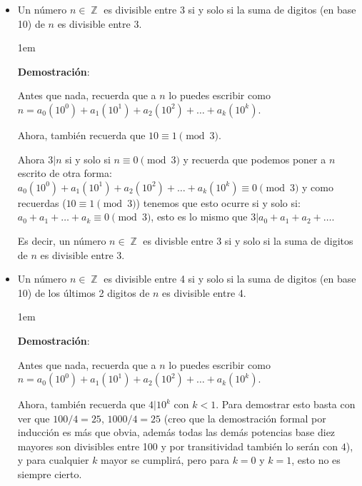\documentclass[12pt, fleqn]{report}                             %
\newenvironment{SmallIndentation}[1][0.75em]                    %
    {\begin{adjustwidth}{#1}{}\begin{footnotesize}}                 %
    {\end{footnotesize}\end{adjustwidth}}                           %
\DeclareMathOperator \Integers  {\mathbb{Z}}                     %
\begin{document}
            \begin{itemize}

                \item Un número $n \in \Integers$ es divisible entre 3 si y solo si
                    la suma de digitos (en base 10) de $n$ es divisible entre 3.

                    \begin{SmallIndentation}[1em]
                        \textbf{Demostración}:

                        Antes que nada, recuerda que a $n$ lo puedes escribir como
                        $n = a_0(10^0) + a_1(10^1) + a_2(10^2) + \dots + a_k(10^k)$.

                        Ahora, también recuerda que $10 \equiv 1 \pmod{3}$.

                        Ahora $3|n$ si y solo si $n \equiv 0 \pmod{3}$ y recuerda
                        que podemos poner a $n$ escrito de otra forma:
                        $a_0(10^0) + a_1(10^1) + a_2(10^2) + \dots + a_k(10^k) \equiv 0 \pmod{3}$
                        y como recuerdas ($10 \equiv 1 \pmod{3}$) tenemos que esto ocurre
                        si y solo si:  $a_0 + a_1 +\dots +a_k \equiv 0 \pmod{3}$, esto es lo mismo que
                        $3|a_0+a_1+a_2+\dots$.

                        Es decir, un número $n \in \Integers$ es divisble entre 3 si y solo si
                        la suma de digitos de $n$ es divisible entre 3.

                    \end{SmallIndentation}

                \item Un número $n \in \Integers$ es divisible entre 4 si y solo si
                    la suma de digitos (en base 10) de los últimos 2 digitos de $n$ es divisible
                    entre 4.

                    \begin{SmallIndentation}[1em]
                        \textbf{Demostración}:

                        Antes que nada, recuerda que a $n$ lo puedes escribir como
                        $n = a_0(10^0) + a_1(10^1) + a_2(10^2) + \dots + a_k(10^k)$.

                        Ahora, también recuerda que $4 |10^k$ con $k<1$.
                        Para demostrar esto basta con ver que $100/4 = 25$, 
                        $1000/4 = 25$ (creo que la demostración formal por inducción
                        es más que obvia, además todas las demás potencias base diez mayores son
                        divisibles entre 100 y por transitividad también lo serán con $4$), y para
                        cualquier $k$ mayor se cumplirá, pero para $k=0$ y $k=1$, esto no es siempre cierto.


\end{SmallIndentation}
\end{itemize}
\end{document}

